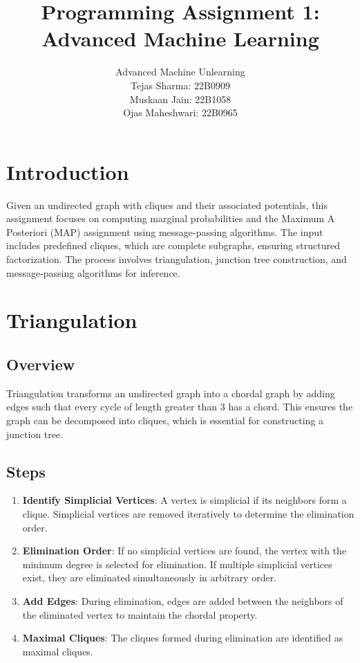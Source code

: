 \documentclass{article}
\title{Programming Assignment 1: Advanced Machine Learning}
\author{
    Advanced Machine Unlearning \\
    Tejas Sharma: 22B0909 \\
    Muskaan Jain: 22B1058 \\
    Ojas Maheshwari: 22B0965
}
\date{}
\begin{document}
\maketitle
\tableofcontents
\clearpage

\section{Introduction}
Given an undirected graph with cliques and their associated potentials, this assignment focuses on computing marginal probabilities and the Maximum A Posteriori (MAP) assignment using message-passing algorithms. The input includes predefined cliques, which are complete subgraphs, ensuring structured factorization. The process involves triangulation, junction tree construction, and message-passing algorithms for inference.

\section{Triangulation}
\subsection{Overview}
Triangulation transforms an undirected graph into a chordal graph by adding edges such that every cycle of length greater than 3 has a chord. This ensures the graph can be decomposed into cliques, which is essential for constructing a junction tree.

\subsection{Steps}
\begin{enumerate}
    \item \textbf{Identify Simplicial Vertices}: A vertex is simplicial if its neighbors form a clique. Simplicial vertices are removed iteratively to determine the elimination order.
    \item \textbf{Elimination Order}: If no simplicial vertices are found, the vertex with the minimum degree is selected for elimination. If multiple simplicial vertices exist, they are eliminated simultaneously in arbitrary order.
    \item \textbf{Add Edges}: During elimination, edges are added between the neighbors of the eliminated vertex to maintain the chordal property.
    \item \textbf{Maximal Cliques}: The cliques formed during elimination are identified as maximal cliques.
\end{enumerate}
\end{document}
